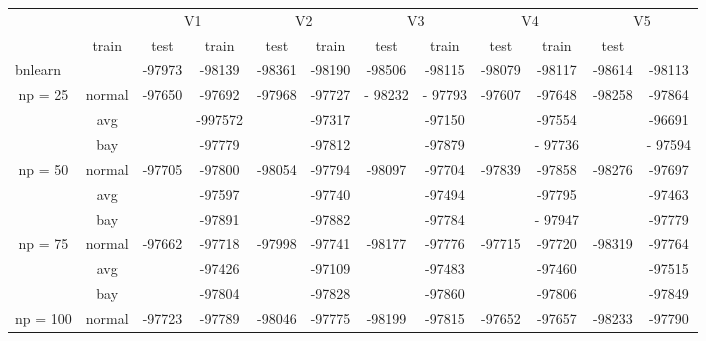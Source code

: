 \documentclass[]{scrartcl}
\begin{document}
\begin{scriptsize}
\begin{center}
\begin{tabular}{cc|cc|cc|cc|cc|cc}
 & & \multicolumn{2}{c}{V1} & \multicolumn{2}{c}{V2} & \multicolumn{2}{c}{V3} & \multicolumn{2}{c}{V4} & \multicolumn{2}{c}{V5} \\
  & train & test & train & test  & train & test  & train & test  & train & test  \\
  \multicolumn{2}{l|}{bnlearn} & -97973  & -98139  & -98361  & -98190  & -98506  & -98115  & -98079  & -98117  & -98614  & -98113  \\\hline\hline
       \multirow{3}{*}{np = 25} & normal & -97650 & -97692 & -97968  & -97727  & - 98232 & - 97793 & -97607  & -97648  & -98258  & -97864  \\
                                                    & avg             & & -997572            & & -97317                 & & -97150                   & & -97554                 & & -96691 \\
                                                    & bay             & & -97779              & & -97812                 & & -97879                   & & - 97736                & & - 97594 \\\cline{1-12}
    \multirow{3}{*}{np = 50} & normal &-97705 & -97800  & -98054  &-97794  & -98097 & -97704 & -97839  & -97858  & -98276  & -97697 \\
    												& avg        & & -97597                 & & -97740                 & & -97494                & & -97795                & & -97463 \\
                                                     & bay        & & -97891                & & -97882                 & & -97784                & & - 97947                & & -97779 \\\cline{1-12}
  \multirow{3}{*}{np = 75} & normal & -97662 & -97718  & -97998  & -97741  &  -98177 & -97776  & -97715  & -97720  & -98319  & -97764 \\
    												   & avg        & & -97426             & & -97109                 & & -97483                  & & -97460                 & & -97515 \\
                                                       & bay        & & -97804              & & -97828                & & -97860                  & &  -97806                & & -97849 \\\cline{1-12}
 \multirow{3}{*}{np = 100} & normal & -97723  & -97789  & -98046  & -97775  & -98199  & -97815  & -97652  & -97657  & -98233  & -97790  \\

\end{tabular}
\end{center}
\end{scriptsize}
\end{document}
